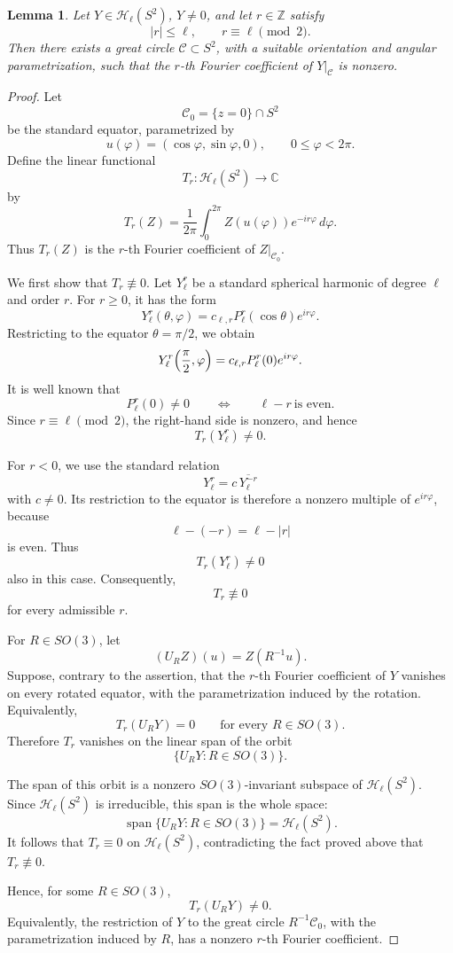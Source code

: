 \documentclass[10pt,a4paper]{amsart}
\newtheorem{lemma}[theorem]{Lemma}
\begin{document}
\begin{lemma}\label{l1O177}
	Let \(Y\in\mathcal H_\ell(S^2)\), \(Y\neq0\), and let \(r\in\mathbb Z\)
	satisfy
	\[
	|r|\leq \ell,
	\qquad
	r\equiv \ell\pmod 2.
	\]
	Then there exists a great circle \(\mathcal C\subset S^2\), with a suitable
	orientation and angular parametrization, such that the \(r\)-th Fourier
	coefficient of \(Y|_{\mathcal C}\) is nonzero.
\end{lemma}

\begin{proof}
	Let
	\[
	\mathcal C_0=\{z=0\}\cap S^2
	\]
	be the standard equator, parametrized by
	\[
	u(\varphi)=(\cos\varphi,\sin\varphi,0),
	\qquad
	0\leq\varphi<2\pi.
	\]
	Define the linear functional
	\[
	T_r:\mathcal H_\ell(S^2)\longrightarrow\mathbb C
	\]
	by
	\[
	T_r(Z)
	=
	\frac{1}{2\pi}
	\int_0^{2\pi}
	Z(u(\varphi))e^{-ir\varphi}\,d\varphi.
	\]
	Thus \(T_r(Z)\) is the \(r\)-th Fourier coefficient of
	\(Z|_{\mathcal C_0}\).
	
	We first show that \(T_r\not\equiv0\). Let \(Y_\ell^r\) be a standard
	spherical harmonic of degree \(\ell\) and order \(r\). For \(r\geq0\), it
	has the form
	\[
	Y_\ell^r(\theta,\varphi)
	=
	c_{\ell,r}P_\ell^r(\cos\theta)e^{ir\varphi}.
	\]
	Restricting to the equator \(\theta=\pi/2\), we obtain
	\[
	Y_\ell^r\Bigl(\frac{\pi}{2},\varphi\Bigr)
	=
	c_{\ell,r}P_\ell^r(0)e^{ir\varphi}.
	\]
	It is well known that
	\[
	P_\ell^r(0)\neq0
	\qquad\Longleftrightarrow\qquad
	\ell-r\ \text{is even}.
	\]
	Since \(r\equiv\ell\pmod2\), the right-hand side is nonzero, and hence
	\[
	T_r(Y_\ell^r)\neq0.
	\]
	
	For \(r<0\), we use the standard relation
	\[
	Y_\ell^r
	=
	c\,\overline{Y_\ell^{-r}}
	\]
	with \(c\neq0\). Its restriction to the equator is therefore a nonzero
	multiple of \(e^{ir\varphi}\), because
	\[
	\ell-(-r)=\ell-|r|
	\]
	is even. Thus
	\[
	T_r(Y_\ell^r)\neq0
	\]
	also in this case. Consequently,
	\[
	T_r\not\equiv0
	\]
	for every admissible \(r\).
	
	For \(R\in SO(3)\), let
	\[
	(U_RZ)(u)=Z(R^{-1}u).
	\]
	Suppose, contrary to the assertion, that the \(r\)-th Fourier coefficient of
	\(Y\) vanishes on every rotated equator, with the parametrization induced by
	the rotation. Equivalently,
	\[
	T_r(U_RY)=0
	\qquad
	\text{for every }R\in SO(3).
	\]
	Therefore \(T_r\) vanishes on the linear span of the orbit
	\[
	\{U_RY:R\in SO(3)\}.
	\]
	
	The span of this orbit is a nonzero \(SO(3)\)-invariant subspace of
	\(\mathcal H_\ell(S^2)\). Since \(\mathcal H_\ell(S^2)\) is irreducible, this
	span is the whole space:
	\[
	\operatorname{span}\{U_RY:R\in SO(3)\}
	=
	\mathcal H_\ell(S^2).
	\]
	It follows that \(T_r\equiv0\) on \(\mathcal H_\ell(S^2)\), contradicting
	the fact proved above that \(T_r\not\equiv0\).
	
	Hence, for some \(R\in SO(3)\),
	\[
	T_r(U_RY)\neq0.
	\]
	Equivalently, the restriction of \(Y\) to the great circle
	\(R^{-1}\mathcal C_0\), with the parametrization induced by \(R\), has a
	nonzero \(r\)-th Fourier coefficient.
\end{proof}
\end{document}
